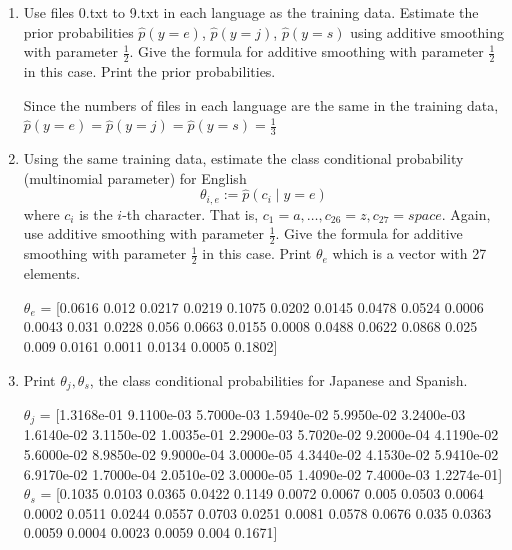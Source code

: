 \documentclass[10pt]{article}
\theoremstyle{definition}
\newenvironment{soln}{
    \leavevmode\color{blue}\ignorespaces
}{}
\begin{document}
\begin{enumerate}
    \item
          Use files 0.txt to 9.txt in each language as the training data.
          Estimate the prior probabilities
          $\hat p(y=e)$,
          $\hat p(y=j)$,
          $\hat p(y=s)$
          using additive smoothing with parameter $\frac{1}{2}$.
          Give the formula for additive smoothing with parameter $\frac{1}{2}$ in this case.
          Print the prior probabilities.

          \begin{soln}
              Since the numbers of files in each language are the same in the training data, $\hat p(y=e) = \hat p(y=j) = \hat p(y=s) = \frac{1}{3}$
          \end{soln}

    \item
          Using the same training data, estimate the class conditional probability (multinomial parameter) for English
          $$\theta_{i,e} := \hat p(c_i \mid y=e)$$
          where $c_i$ is the $i$-th character. That is, $c_1 = a, \ldots, c_{26} = z, c_{27} = space$.
          Again, use additive smoothing with parameter $\frac{1}{2}$.
          Give the formula for additive smoothing with parameter $\frac{1}{2}$ in this case.
          Print $\theta_e$ which is a vector with 27 elements.

          \begin{soln}
              $\theta_e$ = [0.0616 0.012  0.0217 0.0219 0.1075 0.0202 0.0145 0.0478 0.0524 0.0006
              0.0043 0.031  0.0228 0.056  0.0663 0.0155 0.0008 0.0488 0.0622 0.0868
              0.025  0.009  0.0161 0.0011 0.0134 0.0005 0.1802]

          \end{soln}

    \item
          Print $\theta_j, \theta_s$, the class conditional probabilities for Japanese and Spanish.

          \begin{soln}
              $\theta_j$ = [1.3168e-01 9.1100e-03 5.7000e-03 1.5940e-02 5.9950e-02 3.2400e-03
              1.6140e-02 3.1150e-02 1.0035e-01 2.2900e-03 5.7020e-02 9.2000e-04
              4.1190e-02 5.6000e-02 8.9850e-02 9.9000e-04 3.0000e-05 4.3440e-02
              4.1530e-02 5.9410e-02 6.9170e-02 1.7000e-04 2.0510e-02 3.0000e-05
              1.4090e-02 7.4000e-03 1.2274e-01] \\
              $\theta_s$ = [0.1035 0.0103 0.0365 0.0422 0.1149 0.0072 0.0067 0.005  0.0503 0.0064
              0.0002 0.0511 0.0244 0.0557 0.0703 0.0251 0.0081 0.0578 0.0676 0.035
              0.0363 0.0059 0.0004 0.0023 0.0059 0.004  0.1671]
          \end{soln}


\end{enumerate}
\end{document}
